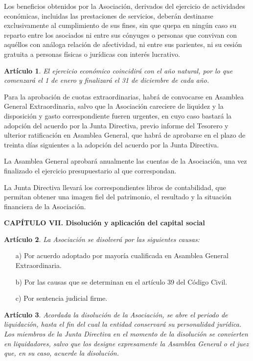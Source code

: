 \documentclass[a4paper,12pt]{article}
\theoremstyle{mystyle}		%
\newtheorem{art}{Artículo}	%
\begin{document}
\begin{onehalfspace}
Los beneficios obtenidos por la Asociación, derivados del ejercicio de actividades económicas, incluidas las prestaciones de servicios, deberán destinarse exclusivamente al cumplimiento de sus fines, sin que quepa en ningún caso su reparto entre los asociados ni entre sus cónyuges o personas que convivan con aquéllos con análoga relación de afectividad, ni entre sus parientes, ni su cesión gratuita a personas físicas o jurídicas con interés lucrativo.

\begin{art}
El ejercicio económico coincidirá con el año natural, por lo que comenzará el 1 de enero y finalizará el 31 de diciembre de cada año.
\end{art}

Para la aprobación de cuotas extraordinarias, habrá de convocarse en Asamblea General Extraordinaria, salvo que la Asociación careciere de liquidez y la disposición y gasto correspondiente fueren urgentes, en cuyo caso bastará la adopción del acuerdo por la Junta Directiva, previo informe del Tesorero y ulterior ratificación en Asamblea General, que habrá de aprobarse en el plazo de treinta días siguientes a la adopción del acuerdo por la Junta Directiva.

La Asamblea General aprobará anualmente las cuentas de la Asociación, una vez finalizado el ejercicio presupuestario al que correspondan.

La Junta Directiva llevará los correspondientes libros de contabilidad, que permitan obtener una imagen fiel del patrimonio, el resultado y la situación financiera de la Asociación.

\bigskip

\begin{center}
\textbf{CAPÍTULO VII. Disolución y aplicación del capital social}
\end{center}

\begin{art}
La Asociación se disolverá por las siguientes causas:
\end{art}
\begin{itemize}
\item [a)] Por acuerdo adoptado por mayoría cualificada en Asamblea General Extraordinaria.
\item [b)] Por las causas que se determinan en el artículo 39 del Código Civil.
\item [c)] Por sentencia judicial firme.
\end{itemize}

\begin{art}
Acordada la disolución de la Asociación, se abre el periodo de liquidación, hasta el fin del cual la entidad conservará su personalidad jurídica. Los miembros de la Junta Directiva en el momento de la disolución se convierten en liquidadores, salvo que los designe expresamente la Asamblea General o el juez que, en su caso, acuerde la disolución.
\end{art}


\end{onehalfspace}
\end{document}
